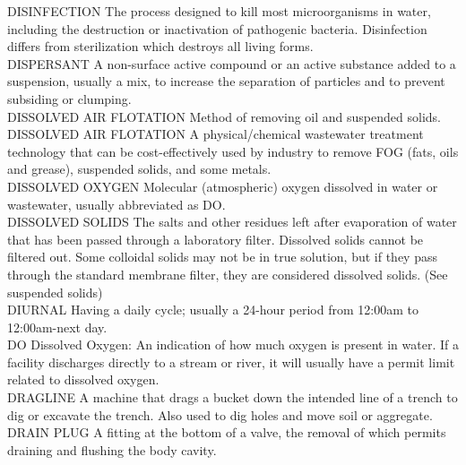 \documentclass{article}
\begin{document}
DISINFECTION
The process designed to kill most microorganisms in water, including the destruction or inactivation of pathogenic bacteria. Disinfection differs from sterilization which destroys all living forms.
\vspace{0.3cm}\\
DISPERSANT
A non-surface active compound or an active substance added to a suspension, usually a mix, to increase the separation of particles and to prevent subsiding or clumping.
\vspace{0.3cm}\\
DISSOLVED AIR FLOTATION
Method of removing oil and suspended solids.
\vspace{0.3cm}\\
DISSOLVED AIR FLOTATION
A physical/chemical wastewater treatment technology that can be cost-effectively used by industry to remove FOG (fats, oils and grease), suspended solids, and some metals.
\vspace{0.3cm}\\
DISSOLVED OXYGEN
Molecular (atmospheric) oxygen dissolved in water or wastewater, usually abbreviated as DO.
\vspace{0.3cm}\\
DISSOLVED SOLIDS
The salts and other residues left after evaporation of water that has been passed through a laboratory filter. Dissolved solids cannot be filtered out. Some colloidal solids may not be in true solution, but if they pass through the standard membrane filter, they are considered dissolved solids. (See suspended solids)
\vspace{0.3cm}\\
DIURNAL
Having a daily cycle; usually a 24-hour period from 12:00am to 12:00am-next day.
\vspace{0.3cm}\\
DO
Dissolved Oxygen:  An indication of how much oxygen is present in water. If a facility discharges directly to a stream or river, it will usually have a permit limit related to dissolved oxygen.
\vspace{0.3cm}\\
DRAGLINE
A machine that drags a bucket down the intended line of a trench to dig or excavate the trench. Also used to dig holes and move soil or aggregate. 
\vspace{0.3cm}\\
DRAIN PLUG
A fitting at the bottom of a valve, the removal of which permits draining and flushing the body cavity.
\vspace{0.3cm}\\
\end{document}
